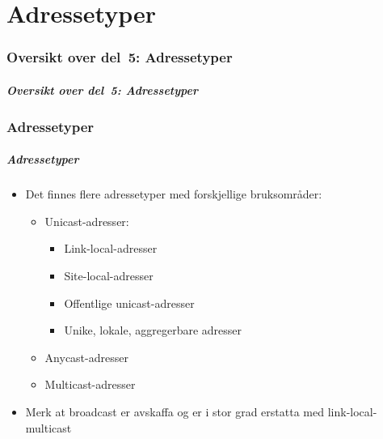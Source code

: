 \part{Adressetyper}

\begin{frame}
  \partpage
\end{frame}

\section*{Oversikt over del~5: Adressetyper}
\begin{frame}%
  \frametitle{Oversikt over del~5: Adressetyper}
    \tableofcontents%
\end{frame}

\section{Adressetyper}
\begin{frame}%
  \frametitle{Adressetyper}
  \pause
  \begin{itemize}[<+->]
  \item Det finnes flere adressetyper med forskjellige bruksområder:
    \begin{itemize}[<+->]
    \item Unicast-adresser:
      \begin{itemize}[<+->]
      \item Link-local-adresser
      \item Site-local-adresser
      \item Offentlige unicast-adresser
      \item Unike, lokale, aggregerbare adresser
      \end{itemize}
    \item Anycast-adresser
    \item Multicast-adresser
    \end{itemize}
  \item Merk at broadcast er avskaffa og er i stor grad erstatta med
    link-local-multicast
  \end{itemize}
\end{frame}


